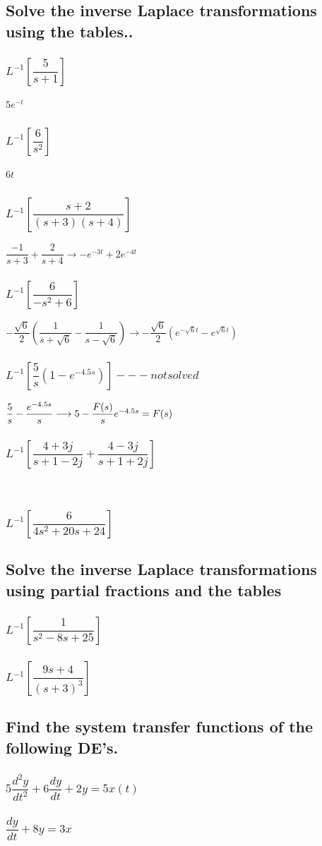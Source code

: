 \documentclass[12pt,a4paper]{article}
\begin{document}
\subsection{Solve the inverse Laplace transformations using the tables..}
\subsubsection{$L^{-1}[\dfrac{5}{s+1}]$}
$5e^{-t}$
\subsubsection{$L^{-1}[\dfrac{6}{s^2}]$}
$6t$
\subsubsection{$L^{-1}[\dfrac{s+2}{(s+3)(s+4)}]$}
$\dfrac{-1}{s+3}+\dfrac{2}{s+4}\longrightarrow -e^{-3t}+2e^{-4t}$
\subsubsection{$L^{-1}[\dfrac{6}{-s^2+6}]$}
$-\dfrac{\sqrt{6}}{2}(\dfrac{1}{s+\sqrt{6}}-\dfrac{1}{s-\sqrt{6}})
\longrightarrow -\dfrac{\sqrt{6}}{2}(e^{-\sqrt{6}t} - e^{\sqrt{6}t})$
\subsubsection{$L^{-1}[\dfrac{5}{s}(1-e^{-4.5s})]---not solved$}
$\dfrac{5}{s}-\dfrac{e^{-4.5s}}{s}\longrightarrow 5 - \dfrac{F(s)}{s}\\
e^{-4.5s}=F(s)$
\subsubsection{$L^{-1}[\dfrac{4+3j}{s+1-2j}+\dfrac{4-3j}{s+1+2j}]$}
$$
\subsubsection{$L^{-1}[\dfrac{6}{4s^2+20s+24}]$}

\subsection{Solve the inverse Laplace transformations using partial fractions and the tables}
\subsubsection{$L^{-1}[\dfrac{1}{s^2-8s+25}]$}
\subsubsection{$L^{-1}[\dfrac{9s+4}{(s+3)^3}]$}

\subsection{Find the system transfer functions of the following DE's.}
\subsubsection{$5\dfrac{d^2y}{dt^2}+6\dfrac{dy}{dt}+2y=5x(t)$}
\subsubsection{$\dfrac{dy}{dt}+8y=3x$}
\end{document}
